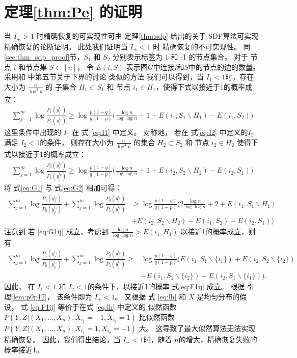 \section{定理\ref{thm:Pe} 的证明}
当 $I_+ > 1$ 时精确恢复的可实现性可由 定理\ref{thm:sdp} 给出的关于 SDP算法可实现精确恢复的论断证明。
此处我们证明当 $I_+ < 1$ 时  %
精确恢复的不可实现性。
同\ref{sec:thm_sdp_proof}节，$S_1$ 和 $S_2$ 分别表示标签为 1 和 -1 的节点集合。
对于 节点 $i$ 和节点集 $S\subset [n]$，
令 $E(i,S)$ 表示图$G$中连接$i$和$S$中的节点的边的数量。
采用和 \cite{abbe2015exact} 中第五节关于下界的讨论 类似的方法
我们可以得到，当 $I_1<1$时，存在大小为 $\frac{n}{\log^3 n}$  的 子集合
    $H_1\subset S_1$ 和 节点 $i_1\in H_1$，使得下式以接近于1的概率成立：
\begin{align}
    \sum_{j=1}^{m} \log \frac{P_1(y^{i_1}_{j})}{P_0(y^{i_1}_{j})}
    \ge \log \frac{p(1-q)}{q(1-p)}\Big(\frac{\log n}{\log\log n}+1
    +E(i_1, S_1 \backslash H_1) - E(i_1, S_2) \Big) \label{eq:G1}
\end{align}
这里条件中出现的 $I_1$ 在 式 \eqref{eq:I1} 中定义。
对称地， 若在 式\eqref{eq:I2} 中定义的$I_2$满足  $I_2<1$的条件，
则存在大小为 $\frac{n}{\log^3 n}$  的集合
    $H_2\subset S_2$ 和 节点 $i_2\in H_2$ 使得下式以接近于1的概率成立：
    \begin{align}
        \sum_{j=1}^{m} \log \frac{P_0(y^{i_2}_{j})}{P_1(y^{i_2}_{j})}
        \ge \log \frac{p(1-q)}{q(1-p)}\Big(\frac{\log n}{\log\log n}+1
        +E(i_2, S_2 \backslash H_2) - E(i_2, S_1) \Big) \label{eq:G2}
    \end{align}	
将 式\eqref{eq:G1} 与 式\eqref{eq:G2} 相加可得：
\begin{align}
    \sum_{j=1}^{m} \log \frac{P_1(y^{i_1}_{j})}{P_0(y^{i_1}_{j})}
    +\sum_{j=1}^{m} \log \frac{P_0(y^{i_2}_{j})}{P_1(y^{i_2}_{j})}
    &\ge \log \frac{p(1-q)}{q(1-p)}\Big(2\frac{\log n}{\log\log n}+2+E(i_1, S_1 \backslash H_1) \nonumber\\
    &+ E(i_2, S_2 \backslash H_2)- E(i_1, S_2 ) - E(i_2, S_1 )\Big) \label{eq:G1ij}
\end{align}	
    注意到 若 \eqref{eq:G1ij} 成立，考虑到 $\frac{\log n}{\log \log n} > E(i_1, H_1)$ 
    以接近1的概率成立，则有
\begin{align}
    \sum_{j=1}^{m} \log \frac{P_1(y^{i_1}_{j})}{P_0(y^{i_1}_{j})}
    +\sum_{j=1}^{m} \log \frac{P_0(y^{i_2}_{j})}{P_1(y^{i_2}_{j})}
    \ge &\log \frac{p(1-q)}{q(1-p)}(E(i_1, S_1 \backslash \{i_1\}) + E(i_2, S_2 \backslash \{i_2\})\nonumber\\
    &- E(i_1, S_2 \backslash \{i_2\}) - E(i_2, S_1 \backslash \{i_1\})) \label{eq:F1ij}.
\end{align}
因此， 在 $I_1<1$ 和 $I_2<1$的条件下，以接近1的概率 式\eqref{eq:F1ij} 成立。
根据 引理\ref{lem:p0p12}，
该条件即为 $I_+<1$。
又根据 式 \eqref{eq:lh} 和 $X$ 是均匀分布的假设，
式 \eqref{eq:F1ij} 等价于在式 \eqref{eq:lh} 中定义的 似然函数
$P(Y,Z|(X_1,\ldots,X_n),X_{i_1}=-1,X_{i_2}=1)$
比似然函数
$P(Y,Z|(X_1,\ldots,X_n),X_{i_1}=1,X_{i_2}=-1)$
大。
这导致了最大似然算法无法实现精确恢复。
因此，我们得出结论，当 $I_+<1$时，随着 $n$的增大，精确恢复失败的概率接近1。

